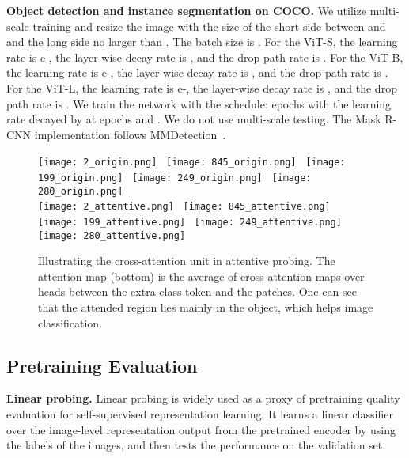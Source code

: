 \documentclass[twocolumn]{svjour3}          \smartqed  \usepackage{graphicx}
\begin{document}
\vspace{1mm}
\noindent\textbf{Object detection and instance segmentation on COCO.}
We utilize multi-scale training 
and resize the
image with the size
of the short side
between  and  
and the long side no larger than .  
The batch size is .
For the ViT-S, the learning rate is e-, the layer-wise decay rate is , and the drop path rate is . 
For the ViT-B, the learning rate is e-, the layer-wise decay rate is , and the drop path rate is . 
For the ViT-L, the learning rate is e-, the layer-wise decay rate is , and the drop path rate is .
We train the network 
with the  schedule:
 epochs with the learning rate decayed
by  at epochs  and .
We do not use multi-scale testing.
The Mask R-CNN implementation follows MMDetection~\cite{mmdetection}.





 \begin{figure}[ht]
\centering
\texttt{[image: 2\_origin.png]}~
\texttt{[image: 845\_origin.png]}~
\texttt{[image: 199\_origin.png]}~
\texttt{[image: 249\_origin.png]}~
\texttt{[image: 280\_origin.png]}\\
\vspace{1mm}
\texttt{[image: 2\_attentive.png]}~
\texttt{[image: 845\_attentive.png]}~
\texttt{[image: 199\_attentive.png]}~
\texttt{[image: 249\_attentive.png]}~
\texttt{[image: 280\_attentive.png]}\\
\caption{
Illustrating 
the cross-attention unit
in attentive probing.
The attention map
(bottom)
is the average 
of cross-attention maps
over  heads
between the extra class token and the patches.
One can see that the attended region lies mainly in the object,
which helps image classification.
}
\label{fig:attentiveprobing}
\end{figure}




\subsection{Pretraining Evaluation}
\noindent\textbf{Linear probing.}
Linear probing is widely used 
as a proxy of pretraining quality evaluation
for self-supervised representation learning.
It learns a linear classifier
over the image-level representation output from the pretrained encoder 
by using the labels of the images,
and then tests the performance
on the validation set.
\end{document}
